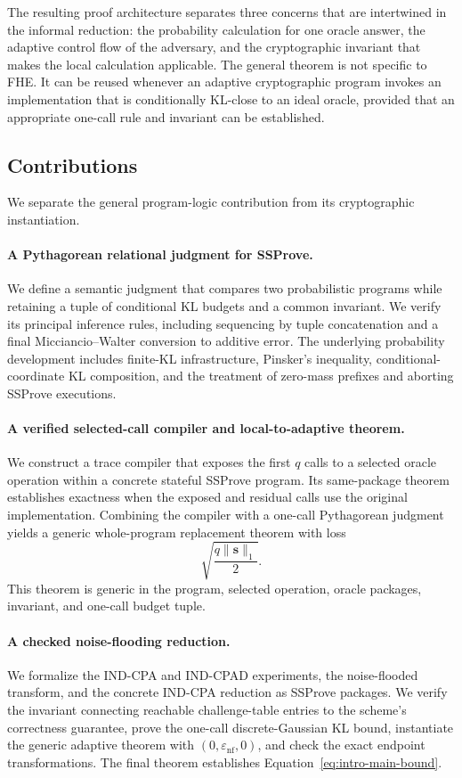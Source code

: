 The resulting proof architecture separates three concerns that are intertwined in the informal reduction: the probability calculation for one oracle answer, the adaptive control flow of the adversary, and the cryptographic invariant that makes the local calculation applicable. The general theorem is not specific to FHE. It can be reused whenever an adaptive cryptographic program invokes an implementation that is conditionally KL-close to an ideal oracle, provided that an appropriate one-call rule and invariant can be established.

\subsection{Contributions}
\label{sec:intro-contributions}

We separate the general program-logic contribution from its cryptographic instantiation.

\paragraph{A Pythagorean relational judgment for SSProve.}
We define a semantic judgment that compares two probabilistic programs while retaining a tuple of conditional KL budgets and a common invariant. We verify its principal inference rules, including sequencing by tuple concatenation and a final Micciancio--Walter conversion to additive error. The underlying probability development includes finite-KL infrastructure, Pinsker's inequality, conditional-coordinate KL composition, and the treatment of zero-mass prefixes and aborting SSProve executions.

\paragraph{A verified selected-call compiler and local-to-adaptive theorem.}
We construct a trace compiler that exposes the first $q$ calls to a selected oracle operation within a concrete stateful SSProve program. Its same-package theorem establishes exactness when the exposed and residual calls use the original implementation. Combining the compiler with a one-call Pythagorean judgment yields a generic whole-program replacement theorem with loss
\[
\sqrt{\frac{q\lVert\mathbf{s}\rVert_{1}}{2}}.
\]
This theorem is generic in the program, selected operation, oracle packages, invariant, and one-call budget tuple.

\paragraph{A checked noise-flooding reduction.}
We formalize the IND-CPA and IND-CPAD experiments, the noise-flooded transform, and the concrete IND-CPA reduction as SSProve packages. We verify the invariant connecting reachable challenge-table entries to the scheme's correctness guarantee, prove the one-call discrete-Gaussian KL bound, instantiate the generic adaptive theorem with $\left(0,\varepsilon_{\mathrm{nf}},0\right)$, and check the exact endpoint transformations. The final theorem establishes Equation~\eqref{eq:intro-main-bound}.

